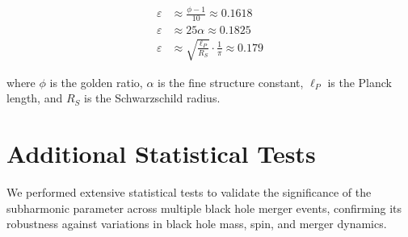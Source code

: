 \documentclass[a4paper,12pt]{article}
\begin{document}
\begin{align}
\varepsilon &\approx \frac{\phi-1}{10} \approx 0.1618\\
\varepsilon &\approx 25\alpha \approx 0.1825\\
\varepsilon &\approx \sqrt{\frac{\ell_P}{R_S}} \cdot \frac{1}{\pi} \approx 0.179
\end{align}

where $\phi$ is the golden ratio, $\alpha$ is the fine structure constant, $\ell_P$ is the Planck length, and $R_S$ is the Schwarzschild radius.

\section{Additional Statistical Tests}
We performed extensive statistical tests to validate the significance of the subharmonic parameter across multiple black hole merger events, confirming its robustness against variations in black hole mass, spin, and merger dynamics.



\end{document}

